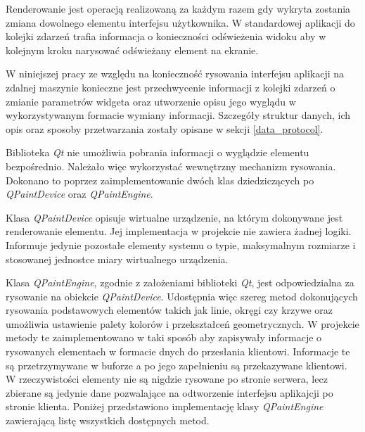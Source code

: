 Renderowanie jest operacją realizowaną za każdym razem gdy wykryta zostania zmiana dowolnego elementu interfejsu użytkownika. W standardowej aplikacji do kolejki zdarzeń trafia informacja o konieczności odświeżenia widoku aby w kolejnym kroku narysować odświeżany element na ekranie. 

W niniejszej pracy ze względu na konieczność rysowania interfejsu aplikacji na zdalnej maszynie konieczne jest przechwycenie informacji z kolejki zdarzeń o zmianie parametrów widgeta oraz utworzenie opisu jego wyglądu w wykorzystywanym formacie wymiany informacji. Szczegóły struktur danych, ich opis oraz sposoby przetwarzania zostały opisane w sekcji \ref{data_protocol}.

Biblioteka \emph{Qt} nie umożliwia pobrania informacji o wyglądzie elementu bezpośrednio. Należało więc wykorzystać wewnętrzny mechanizm rysowania. Dokonano to poprzez zaimplementowanie dwóch klas dziedziczących po \emph{QPaintDevice} oraz \emph{QPaintEngine}. 

Klasa \emph{QPaintDevice} opisuje wirtualne urządzenie, na którym dokonywane jest renderowanie elementu. Jej implementacja w projekcie nie zawiera żadnej logiki. Informuje jedynie pozostałe elementy systemu o typie, maksymalnym rozmiarze i stosowanej jednostce miary wirtualnego urządzenia. 

Klasa \emph{QPaintEngine}, zgodnie z założeniami biblioteki \emph{Qt}, jest odpowiedzialna za rysowanie na obiekcie \emph{QPaintDevice}. Udostępnia więc szereg metod dokonujących rysowania podstawowych elementów takich jak linie, okręgi czy krzywe oraz umożliwia ustawienie palety kolorów i przekształceń geometrycznych. W projekcie metody te zaimplementowano w taki sposób aby zapisywały informacje o rysowanych elementach w formacie dnych do przesłania klientowi. Informacje te są przetrzymywane w buforze a po jego zapełnieniu są przekazywane klientowi. W rzeczywistości elementy nie są nigdzie rysowane po stronie serwera, lecz zbierane są jedynie dane pozwalające na odtworzenie interfejsu aplikajcji po stronie klienta. Poniżej przedstawiono implementację klasy \emph{QPaintEngine} zawierającą listę wszystkich dostępnych metod.

